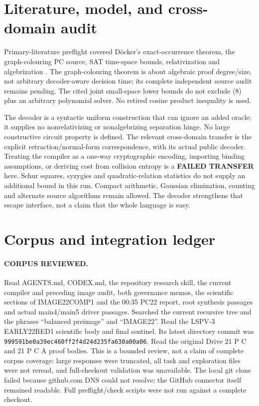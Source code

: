 \documentclass[11pt]{article}
\begin{document}
\section{Literature, model, and cross-domain audit}
Primary-literature preflight covered D\"ocker's exact-occurrence theorem,
the graph-colouring PC source, SAT time-space bounds, relativization and
algebrization \cite{docker,colour,mw,bgs,aw}. The graph-colouring theorem is
about algebraic proof degree/size, not arbitrary decoder-aware decision time;
its complete independent source audit remains pending. The cited joint
small-space lower bounds do not exclude (8) plus an arbitrary polynomial
solver. No retired cosine product inequality is used.

The decoder is a syntactic uniform construction that can ignore an added
oracle; it supplies no nonrelativizing or nonalgebrizing separation hinge.
No large constructive circuit property is defined. The relevant cross-domain
transfer is the explicit retraction/normal-form correspondence, with its
actual public decoder. Treating the compiler as a one-way cryptographic
encoding, importing binding assumptions, or deriving cost from collision
entropy is a \textbf{FAILED TRANSFER} here. Schur squares, syzygies and
quadratic-relation statistics do not supply an additional bound in this run.
Compact arithmetic, Gaussian elimination, counting and alternate source
algorithms remain allowed. The decoder strengthens that escape interface,
not a claim that the whole language is easy.

\section{Corpus and integration ledger}
\paragraph{CORPUS REVIEWED.}
Read AGENTS.md, CODEX.md, the repository research skill, the current compiler
and preceding image audit, both governance memos, the scientific sections of
IMAGE22COMP1 and the 00:35 PC22 report, root synthesis passages and actual
main4/main5 driver passages. Searched the current recursive tree and the
phrases ``balanced preimage'' and ``IMAGE22''. Read the LSPV-3 EARLY22RED1
scientific body and final sentinel. Its latest directory commit was
\texttt{999591be0a39ec460ff2f4d24d235fa630a00a06}. Read the original Drive
21 P C and 21 P C A proof bodies. This is a bounded review, not a claim of
complete corpus coverage: large responses were truncated, all task and
exploration files were not reread, and full-checkout validation was unavailable.
The local git clone failed because github.com DNS could not resolve; the
GitHub connector itself remained readable. Full preflight/check scripts were
not run against a complete checkout.
\end{document}
